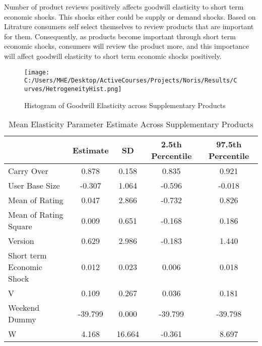 \documentclass[mksc,nonblindrev]{informs3}
\begin{document}
\indent Number of product reviews positively affects goodwill elasticity to short term economic shocks. This shocks either could be supply or demand shocks. Based on Litrature consumers self select themselves to review products that are important for them. Consequently, as products become important through short term economic shocks, consumers will review the product more, and this importance will affect goodwill elasticity to short term economic shocks positively. 


\begin{figure}
	\centering
		\texttt{[image: C:/Users/MHE/Desktop/ActiveCourses/Projects/Noris/Results/Curves/HetrogeneityHist.png]}
	\caption{Histogram of Goodwill Elasticity across Supplementary Products}
	\label{fig:BasicStat1}
\end{figure}

\begin{table}
	\centering
		\begin{tabular}{lcccc} \hline \hline
					&	Estimate	&	SD	&	2.5th Percentile	&	97.5th 
					Percentile	\\ \hline
					Carry Over	&	0.878	&	0.158	&	0.835	&	0.921	\\
					User Base Size	&	-0.307	&	1.064	&	-0.596	&	-0.018	\\
					Mean of Rating	&	0.047	&	2.866	&	-0.732	&	0.826	\\
					Mean of Rating Square	&	0.009	&	0.651	&	-0.168	&	0.186	\\
					Version	&	0.629	&	2.986	&	-0.183	&	1.440	\\
					Short term Economic Shock	&	0.012	&	0.023	&	0.006	&	0.018	\\
					V	&	0.109	&	0.267	&	0.036	&	0.181	\\
					Weekend Dummy	&	-39.799	&	0.000	&	-39.799	&	-39.798	\\
					W	&	4.168	&	16.664	&	-0.361	&	8.697	\\ \hline
		\end{tabular}
	\caption{Mean Elasticity Parameter Estimate Across Supplementary Products}
	\label{tab:MeanElasticity}
\end{table}
\end{document}
